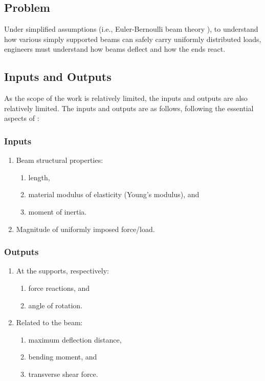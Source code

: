 \documentclass{article}
\begin{document}
\subsection{Problem}
\label{problem-statement:problem}

Under simplified assumptions (i.e., Euler-Bernoulli beam theory
\cite{EulerBernoulliWiki}), to understand how various simply supported beams can
safely carry uniformly distributed loads, engineers must understand how beams
deflect and how the ends react.

\subsection{Inputs and Outputs}
\label{problem-statement:inputs-and-outputs}

As the scope of the work is relatively limited, the inputs and outputs are also
relatively limited. The inputs and outputs are as follows, following the
essential aspects of \cite{Lemonis2022}:

\subsubsection{Inputs}
\label{problem-statement:inputs-and-outputs:inputs}

\begin{enumerate}
    \item Beam structural properties:
          \begin{enumerate}
              \item length,
              \item material modulus of elasticity (Young's modulus), and
              \item moment of inertia.
          \end{enumerate}
    \item Magnitude of uniformly imposed force/load.
\end{enumerate}

\subsubsection{Outputs}

\begin{enumerate}
    \item At the supports, respectively:
          \begin{enumerate}
              \item force reactions, and
              \item angle of rotation.
          \end{enumerate}

    \item Related to the beam:
          \begin{enumerate}
              \item maximum deflection distance,
              \item bending moment, and
              \item transverse shear force.
          \end{enumerate}
\end{enumerate}
\end{document}
